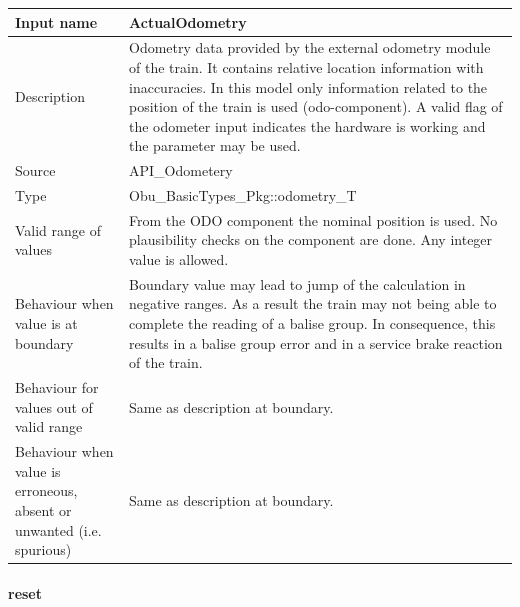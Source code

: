 \begin{longtable}{p{}p{}}
\toprule
Input name				& ActualOdometry \\
\midrule
Description				& Odometry data provided by the external odometry module of the train. It contains relative location information with inaccuracies. In this model only information related to the position of the train is used (odo-component). A valid flag of the odometer input indicates the hardware is working and the parameter may be used.\\
\midrule
Source					& API\_Odometery \\ 
\midrule
Type					& Obu\_BasicTypes\_Pkg::odometry\_T \\
\midrule
Valid range of values	& From the ODO component the nominal position is used. No plausibility checks on the component are done. Any integer value is allowed. \\
\midrule
Behaviour when value is at boundary	& Boundary value may lead to jump of the calculation in negative ranges. As a result the train may not being able to complete the reading of a balise group. In consequence, this results in a balise group error and in a service brake reaction of the train.\\
\midrule
Behaviour for values out of valid range	& Same as description at boundary.\\
\midrule
Behaviour when value is erroneous, absent or unwanted (i.e. spurious) & Same as description at boundary.\\

\bottomrule
\end{longtable}

\paragraph{reset}

